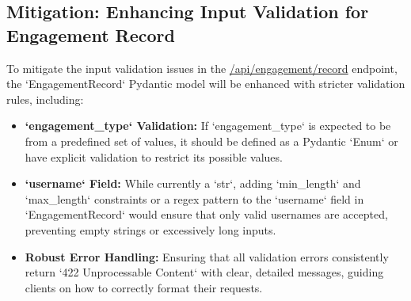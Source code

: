 \documentclass{article}
\begin{document}
\subsection{\texorpdfstring{\textbf{Mitigation: Enhancing Input Validation for Engagement Record}}{Mitigation: Enhancing Input Validation for Engagement Record}}
To mitigate the input validation issues in the \url{/api/engagement/record} endpoint, the `EngagementRecord` Pydantic model will be enhanced with stricter validation rules, including:
\begin{itemize}
    \item \textbf{`engagement_type` Validation:}
    If `engagement_type` is expected to be from a predefined set of values, it should be defined as a Pydantic `Enum` or have explicit validation to restrict its possible values.
    \item \textbf{`username` Field:}
    While currently a `str`, adding `min_length` and `max_length` constraints or a regex pattern to the `username` field in `EngagementRecord` would ensure that only valid usernames are accepted, preventing empty strings or excessively long inputs.
    \item \textbf{Robust Error Handling:}
    Ensuring that all validation errors consistently return `422 Unprocessable Content` with clear, detailed messages, guiding clients on how to correctly format their requests.
\end{itemize}
\end{document}
